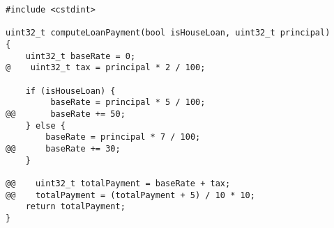 \begin{lstlisting}[style=CStyle]
#include <cstdint>

uint32_t computeLoanPayment(bool isHouseLoan, uint32_t principal) 
{ 
    uint32_t baseRate = 0; 
@    uint32_t tax = principal * 2 / 100; 
    
    if (isHouseLoan) {
         baseRate = principal * 5 / 100; 
@@       baseRate += 50; 
    } else { 
        baseRate = principal * 7 / 100; 
@@      baseRate += 30; 
    } 
    
@@    uint32_t totalPayment = baseRate + tax; 
@@    totalPayment = (totalPayment + 5) / 10 * 10; 
    return totalPayment; 
}
\end{lstlisting}
